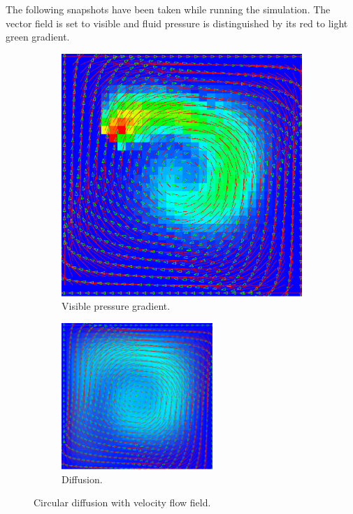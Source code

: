 \documentclass[12pt, titlepage]{article}
\begin{document}
The following snapshots have been taken while running the simulation. The vector field is set to visible and fluid pressure is distinguished by its red to light green gradient.

\begin{figure}[h!]
  \centering
  \begin{subfigure}[b]{0.4\linewidth}
    \includegraphics[width=\linewidth]{images/sim2.png}
    \caption{Visible pressure gradient.}
  \end{subfigure}
  \begin{subfigure}[b]{0.4\linewidth}
    \includegraphics[width=\linewidth, height=55.3mm]{images/sim1.png}
    \caption{Diffusion.}
  \end{subfigure}
  \caption{Circular diffusion with velocity flow field.}
  \label{fig:circular}
\end{figure}
\end{document}
